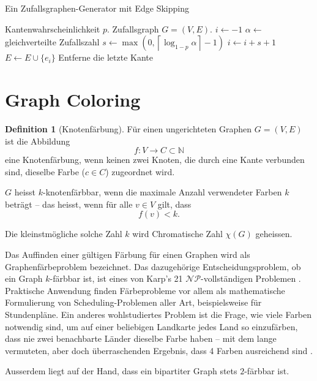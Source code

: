 \documentclass[11pt]{scrreprt} %
\theoremstyle{definition}
\newtheorem{definition}{Definition}
\begin{document}
\begin{enumerate}
\begin{algorithm}
\caption{Ein Zufallsgraphen-Generator mit Edge Skipping}
\label{gen.opt}
\begin{algorithmic}
\Require
	\Statex Kantenwahrscheinlichkeit $p$.
\Ensure
	\Statex Zufallsgraph $G = (V, E)$.
\Statex
\Statex $i \gets -1$
\State $\alpha\gets$ gleichverteilte Zufallszahl
\State $s \gets \max(0, \left\lceil \log_{1-p}\alpha\right\rceil - 1)$
\State $i \gets i + s + 1$
\State $E \gets E \cup \{e_i\}$
\EndWhile
\State Entferne die letzte Kante
\end{algorithmic}
\end{algorithm}

\end{enumerate}

\section{Graph Coloring}

\begin{definition}[Knotenfärbung]

Für einen ungerichteten Graphen $G = (V, E)$ ist die Abbildung
\[
f : V \rightarrow C \subset \mathbb{N}
\]
eine Knotenfärbung, wenn keinen zwei Knoten, die durch eine Kante verbunden sind, dieselbe Farbe ($c \in C$) zugeordnet wird.

$G$ heisst $k$-knotenfärbbar, wenn die maximale Anzahl verwendeter Farben $k$ beträgt -- das heisst, wenn für alle $v \in V$ gilt, dass
\[
f(v) < k.
\]

Die kleinstmögliche solche Zahl $k$ wird Chromatische Zahl $\chi(G)$ geheissen.

\end{definition}

Das Auffinden einer gültigen Färbung für einen Graphen wird als Graphenfärbeproblem bezeichnet. Das dazugehörige Entscheidungsproblem, ob ein Graph $k$-färbbar ist, ist eines von Karp's 21 $\mathcal{NP}$-vollständigen Problemen \cite{hopcroft}. Praktische Anwendung finden Färbeprobleme vor allem als mathematische Formulierung von Scheduling-Problemen aller Art, beispielsweise für Stundenpläne. Ein anderes wohlstudiertes Problem ist die Frage, wie viele Farben notwendig sind, um auf einer beliebigen Landkarte jedes Land so einzufärben, dass nie zwei benachbarte Länder dieselbe Farbe haben -- mit dem lange vermuteten, aber doch überraschenden Ergebnis, dass 4 Farben ausreichend sind \cite{gonthier}.

\bigskip
Ausserdem liegt auf der Hand, dass ein bipartiter Graph stets $2$-färbbar ist.
\end{document}
